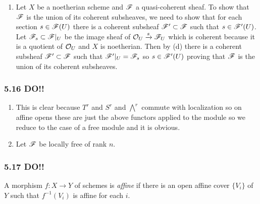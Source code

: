 \documentclass[12pt]{article}
\begin{document}
\begin{enumerate}
\item Let $X$ be a noetherian scheme and $\mathscr{F}$ a quasi-coherent sheaf. To show that $\mathscr{F}$ is the union of its coherent subsheaves, we need to show that for each section $s \in \mathscr{F}(U)$ there is a coherent subsheaf $\mathscr{F}' \subset \mathscr{F}$ such that $s \in \mathscr{F}'(U)$. Let $\mathscr{F}_s \subset \mathscr{F}|_U$ be the image sheaf of $\mathcal{O}_{U} \xrightarrow{s} \mathscr{F}_U$ which is coherent because it is a quotient of $\mathcal{O}_{U}$ and $X$ is noetherian. Then by (d) there is a coherent subsheaf $\mathscr{F}' \subset \mathscr{F}$ such that $\mathscr{F}'|_U = \mathscr{F}_s$ so $s \in \mathscr{F}'(U)$ proving that $\mathscr{F}$ is the union of its coherent subsheaves.
\end{enumerate}

\subsubsection{5.16 DO!!}

\begin{enumerate}
\item This is clear because $T^r$ and $S^r$ and $\bigwedge^r$ commute with localization so on affine opens these are just the above functors applied to the module so we reduce to the case of a free module and it is obvious.

\item Let $\mathscr{F}$ be locally free of rank $n$. 
\end{enumerate}

\subsubsection{5.17 DO!!}

A morphism $f : X \to Y$ of schemes is \textit{affine} if there is an open affine cover $\{ V_i \}$ of $Y$ such that $f^{-1}(V_i)$ is affine for each $i$.
\end{document}
